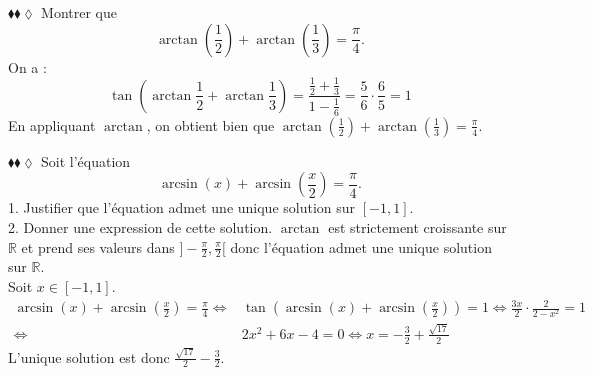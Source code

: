 \documentclass[11pt]{article}
\begin{document}
\begin{exercice}{$\blacklozenge\blacklozenge\lozenge$}{}
    Montrer que
    \begin{equation*}
        \arctan\left(\frac{1}{2}\right)+\arctan\left(\frac{1}{3}\right)=\frac{\pi}{4}.
    \end{equation*}
    \tcblower
    On a :
    \begin{equation*}
        \tan\left(\arctan\frac{1}{2}+\arctan\frac{1}{3}\right)
        =\frac{\frac{1}{2}+\frac{1}{3}}{1-\frac{1}{6}}
        =\frac{5}{6}\cdot\frac{6}{5}
        =1
    \end{equation*}
    En appliquant $\arctan$, on obtient bien que $\arctan\left(\frac{1}{2}\right)+\arctan\left(\frac{1}{3}\right)=\frac{\pi}{4}.$
\end{exercice}

\pagebreak

\begin{exercice}{$\blacklozenge\blacklozenge\lozenge$}{}
    Soit l'équation
    \begin{equation*}
        \arcsin(x)+\arcsin\left(\frac{x}{2}\right)=\frac{\pi}{4}.
    \end{equation*}
    1. Justifier que l'équation admet une unique solution sur $[-1,1]$.\\
    2. Donner une expression de cette solution.
    \tcblower
     $\arctan$ est strictement croissante sur $\mathbb{R}$ et prend ses valeurs dans $]-\frac{\pi}{2},\frac{\pi}{2}[$ donc l'équation admet une unique solution sur $\mathbb{R}$.\\[0.25cm]
     Soit $x\in[-1,1]$.
    \begin{align*}
        \arcsin(x)+\arcsin(\frac{x}{2})=\frac{\pi}{4}
        \iff&\tan(\arcsin(x)+\arcsin(\frac{x}{2}))=1
        \iff\frac{3x}{2}\cdot\frac{2}{2-x^2}=1\\
        \iff&2x^2+6x-4=0
        \iff x=-\frac{3}{2}+\frac{\sqrt{17}}{2}
    \end{align*}
    L'unique solution est donc $\frac{\sqrt{17}}{2}-\frac{3}{2}$.
\end{exercice}
\end{document}
